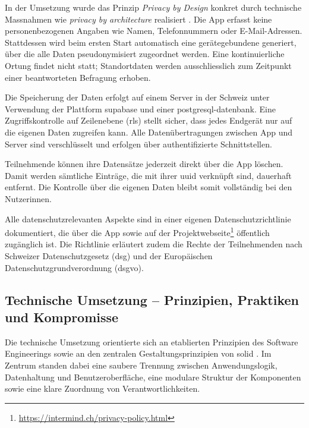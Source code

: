 In der Umsetzung wurde das Prinzip \textit{Privacy by Design} konkret durch technische Massnahmen wie \textit{privacy by architecture} realisiert \parencite{spiekermannEngineeringPrivacy2009}. Die App erfasst keine personenbezogenen Angaben wie Namen, Telefonnummern oder E-Mail-Adressen. Stattdessen wird beim ersten Start automatisch eine gerätegebundene  generiert, über die alle Daten pseudonymisiert zugeordnet werden. Eine kontinuierliche Ortung findet nicht statt; Standortdaten werden ausschliesslich zum Zeitpunkt einer beantworteten Befragung erhoben.


Die Speicherung der Daten erfolgt auf einem Server in der Schweiz unter Verwendung der Plattform \gls{supabase} und einer \gls{postgresql}-\gls{datenbank}. Eine Zugriffskontrolle auf Zeilenebene (\gls{rls}) stellt sicher, dass jedes Endgerät nur auf die eigenen Daten zugreifen kann. Alle Datenübertragungen zwischen App und Server sind verschlüsselt und erfolgen über authentifizierte Schnittstellen.

Teilnehmende können ihre Datensätze jederzeit direkt über die App löschen. Damit werden sämtliche Einträge, die mit ihrer \gls{uuid} verknüpft sind, dauerhaft entfernt. Die Kontrolle über die eigenen Daten bleibt somit vollständig bei den Nutzer\genderstern innen.

Alle datenschutzrelevanten Aspekte sind in einer eigenen Datenschutzrichtlinie dokumentiert, die über die App sowie auf der Projektwebseite\footnote{\href{https://intermind.ch/privacy-policy.html}{https://intermind.ch/privacy-policy.html}} öffentlich zugänglich ist. Die Richtlinie erläutert zudem die Rechte der Teilnehmenden nach Schweizer Datenschutzgesetz (\gls{dsg}) und der Europäischen Datenschutzgrundverordnung (\gls{dsgvo}).


\subsection{Technische Umsetzung – Prinzipien, Praktiken und Kompromisse}

Die technische Umsetzung orientierte sich an etablierten Prinzipien des Software Engineerings \parencite{sommervilleSoftwareEngineering2016} sowie an den zentralen Gestaltungsprinzipien von \gls{solid} \parencite{martinAgileSoftwareDevelopment2002}. Im Zentrum standen dabei eine saubere Trennung zwischen Anwendungslogik, Datenhaltung und Benutzeroberfläche, eine modulare Struktur der Komponenten sowie eine klare Zuordnung von Verantwortlichkeiten.

